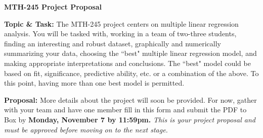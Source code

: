 \documentclass{article}\usepackage[]{graphicx}\usepackage[]{xcolor}
\begin{document}
	
	\huge
	\begin{center}
		\textbf{MTH-245 Project Proposal}
	\end{center}

\large
\vspace{.3cm}

\textbf{Topic \& Task:} The MTH-245 project centers on multiple linear regression analysis. You will be tasked with, working in a team of two-three students, finding an interesting and robust dataset, graphically and numerically summarizing your data, choosing the ``best" multiple linear regression model, and making appropriate interpretations and conclusions. The ``best" model could be based on fit, significance, predictive ability, etc. or a combination of the above. To this point, having more than one best model is permitted. 

\vspace{.2cm}

\textbf{Proposal:} More details about the project will soon be provided. For now, gather with your team and have one member fill in this form and submit the PDF to Box by \textbf{Monday, November 7 by 11:59pm.} \textit{This is your project proposal and must be approved before moving on to the next stage.} 
\end{document}
